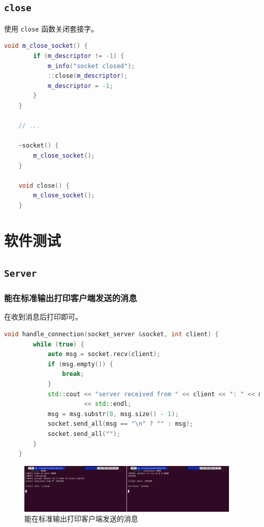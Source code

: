 \documentclass{article}
\begin{document}
\subsection{\texttt{close}}

使用 \texttt{close} 函数关闭套接字。

\begin{lstlisting}[language=C++, title=close]
    void m_close_socket() {
        if (m_descriptor != -1) {
            m_info("socket closed");
            ::close(m_descriptor);
            m_descriptor = -1;
        }
    }

    // ...

    ~socket() {
        m_close_socket();
    }

    void close() {
        m_close_socket();
    }
\end{lstlisting}

\section{软件测试}

\subsection{\texttt{Server}}

\subsubsection{能在标准输出打印客户端发送的消息}

在收到消息后打印即可。

\begin{lstlisting}[language=C++]
    void handle_connection(socket_server &socket, int client) {
        while (true) {
            auto msg = socket.recv(client);
            if (msg.empty()) {
                break;
            }
            std::cout << "server received from " << client << ": " << msg
                      << std::endl;
            msg = msg.substr(0, msg.size() - 1);
            socket.send_all(msg == "\n" ? "" : msg);
            socket.send_all("");
        }
    }
\end{lstlisting}

\begin{figure}[H]
    \centering
    \includegraphics[width=0.95\textwidth]{img/1.png}
    \caption{能在标准输出打印客户端发送的消息}
\end{figure}
\end{document}
